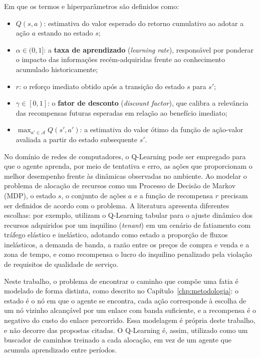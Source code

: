 \noindent Em que os termos e hiperparâmetros são definidos como:
\begin{itemize}
    \item $Q(s, a)$: estimativa do valor esperado do retorno cumulativo ao adotar a ação $a$ estando no estado $s$;
    \item $\alpha \in (0, 1]$: a \textbf{taxa de aprendizado} (\textit{learning rate}), responsável por ponderar o impacto das informações recém-adquiridas frente ao conhecimento acumulado historicamente;
    \item $r$: o reforço imediato obtido após a transição do estado $s$ para $s'$;
    \item $\gamma \in [0, 1]$: o \textbf{fator de desconto} (\textit{discount factor}), que calibra a relevância das recompensas futuras esperadas em relação ao benefício imediato;
    \item $\max_{a' \in \mathcal{A}} Q(s', a')$: a estimativa do valor ótimo da função de ação-valor avaliada a partir do estado subsequente $s'$.
\end{itemize}

No domínio de redes de computadores, o Q-Learning pode ser empregado para que o agente aprenda, por meio de tentativa e erro, as ações que proporcionam o melhor desempenho frente às dinâmicas observadas no ambiente. Ao modelar o problema de alocação de recursos como um Processo de Decisão de Markov (MDP), o estado $s$, o conjunto de ações $a$ e a função de recompensa $r$ precisam ser definidos de acordo com o problema. A literatura apresenta diferentes escolhas: por exemplo,  utilizam o Q-Learning tabular para o ajuste dinâmico dos recursos adquiridos por um inquilino (\textit{tenant}) em um cenário de fatiamento com tráfego elástico e inelástico, adotando como estado a proporção de fluxos inelásticos, a demanda de banda, a razão entre os preços de compra e venda e a zona de tempo, e como recompensa o lucro do inquilino penalizado pela violação de requisitos de qualidade de serviço.

Neste trabalho, o problema de encontrar o caminho que compõe uma fatia é modelado de forma distinta, como descrito no Capítulo~\ref{chp:metodologia}: o estado é o nó em que o agente se encontra, cada ação corresponde à escolha de um nó vizinho alcançável por um enlace com banda suficiente, e a recompensa é o negativo do custo do enlace percorrido. Essa modelagem é própria deste trabalho, e não decorre das propostas citadas. O Q-Learning é, assim, utilizado como um buscador de caminhos treinado a cada alocação, em vez de um agente que acumula aprendizado entre períodos.
